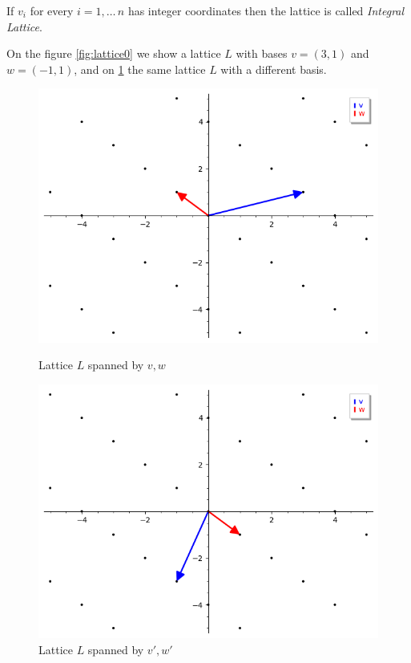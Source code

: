 \documentclass[a4paper,12pt]{report}
\begin{document}
If $v_i$ for every $i = 1,\ldots\,n$ has integer coordinates then the lattice is
called \textit{Integral Lattice}.

On the figure \ref{fig:lattice0} we show a lattice $L$ with bases $v=(3, 1)$ and $w=(-1, 1)$, and on \ref{fig:lattice1} the same lattice $L$ with
a different basis.

\begin{figure}[!tbp]
    \begin{minipage}[b]{0.50\textwidth}
        \includegraphics[width=\textwidth]{./img/lattice_b0.png}
        \caption{Lattice $L$ spanned by $v, w$}
        \label{fig:lattice0}
    \end{minipage}
    \hspace{\fill}
    \hspace{\fill}
    \hspace{\fill}
    \hspace{\fill}
    \hspace{\fill}
    \begin{minipage}[b]{0.50\textwidth}
        \includegraphics[width=\textwidth]{./img/lattice_b1.png}
        \caption{Lattice $L$ spanned by $v', w'$}
        \label{fig:lattice1}
    \end{minipage}
\end{figure}
\end{document}
